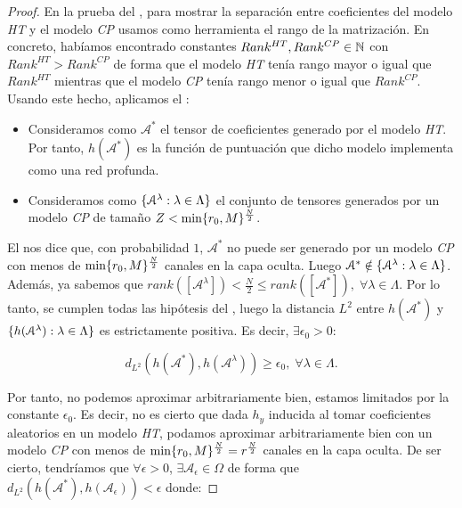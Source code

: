 \begin{proof}

    En la prueba del , para mostrar la separación entre coeficientes del modelo \textit{HT} y el modelo \textit{CP} usamos como herramienta el rango de la matrización. En concreto, habíamos encontrado constantes $Rank^{HT}, Rank^{CP} \in \mathbb{N}$ con $Rank^{HT} > Rank^{CP}$ de forma que el modelo \textit{HT} tenía rango mayor o igual que $Rank^{HT}$ mientras que el modelo \textit{CP} tenía rango menor o igual que $Rank^{CP}$. Usando este hecho, aplicamos el :

    \begin{itemize}
        \item Consideramos como $\mathcal{A}^*$ el tensor de coeficientes generado por el modelo \textit{HT}. Por tanto, $h(\mathcal{A}^*)$ es la función de puntuación que dicho modelo implementa como una red profunda.
        \item Consideramos como $\{ \mathcal{A}^\lambda: \lambda \in \Lambda \}$ el conjunto de tensores generados por un modelo \textit{CP} de tamaño $Z < \min \{ r_0, M \}^{\frac{N}{2}}$.
    \end{itemize}

    El  nos dice que, con probabilidad $1$, $\mathcal{A}^*$ no puede ser generado por un modelo \textit{CP} con menos de $\min \{ r_0, M \}^{\frac{N}{2}}$ canales en la capa oculta. Luego $\mathcal{A}^* \notin \{ \mathcal{A}^\lambda: \lambda \in \Lambda \}$. Además, ya sabemos que $rank([\mathcal{A}^\lambda]) < \frac{N}{2} \leq rank([\mathcal{A}^*]), \; \forall \lambda \in \Lambda$. Por lo tanto, se cumplen todas las hipótesis del , luego la distancia $L^2$ entre $h(\mathcal{A}^*)$ y $\{ h(\mathcal{A}^\lambda): \lambda \in \Lambda \}$ es estrictamente positiva. Es decir, $\exists \epsilon_0 > 0:$

    \begin{equation}
        d_{L^2}(h(\mathcal{A}^*), h(\mathcal{A}^\lambda)) \geq \epsilon_0, \; \forall \lambda \in \Lambda.
    \end{equation}

    Por tanto, no podemos aproximar arbitrariamente bien, estamos limitados por la constante $\epsilon_0$. Es decir, no es cierto que dada $h_y$ inducida al tomar coeficientes aleatorios en un modelo \textit{HT}, podamos aproximar arbitrariamente bien con un modelo \textit{CP} con menos de $\min \{ r_0, M \}^{\frac{N}{2}} = r^{\frac{N}{2}}$ canales en la capa oculta. De ser cierto, tendríamos que $\forall \epsilon > 0$, $\exists \mathcal{A}_\epsilon \in \Omega$ de forma que $d_{L^2}(h(\mathcal{A}^*), h(\mathcal{A}_\epsilon)) < \epsilon$ donde:


\end{proof}
